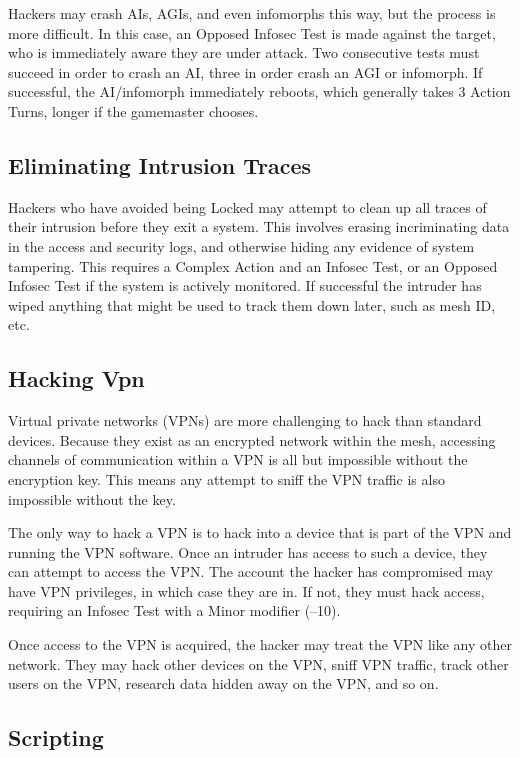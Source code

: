 Hackers may crash AIs, AGIs, and even infomorphs 
this way, but the process is more difficult. In this case, 
an Opposed Infosec Test is made against the target, 
who is immediately aware they are under attack. Two 
consecutive tests must succeed in order to crash an AI, 
three in order crash an AGI or infomorph. If successful, 
the AI/infomorph immediately reboots, which generally 
takes 3 Action Turns, longer if the gamemaster chooses.

\subsection{Eliminating Intrusion Traces}

Hackers who have avoided being Locked may attempt 
to clean up all traces of their intrusion before they 
exit a system. This involves erasing incriminating data 
in the access and security logs, and otherwise hiding 
any evidence of system tampering. This requires a 
Complex Action and an Infosec Test, or an Opposed 
Infosec Test if the system is actively monitored. If successful
the intruder has wiped anything that might be
used to track them down later, such as mesh ID, etc.

\subsection{Hacking Vpn}

Virtual private networks (VPNs) are more challenging
to hack than standard devices. Because they exist
as an encrypted network within the mesh, accessing 
channels of communication within a VPN is all but 
impossible without the encryption key. This means 
any attempt to sniff the VPN traffic is also impossible
without the key.

The only way to hack a VPN is to hack into a 
device that is part of the VPN and running the VPN 
software. Once an intruder has access to such a device, 
they can attempt to access the VPN. The account the 
hacker has compromised may have VPN privileges, in 
which case they are in. If not, they must hack access, 
requiring an Infosec Test with a Minor modifier (–10).

Once access to the VPN is acquired, the hacker may 
treat the VPN like any other network. They may hack 
other devices on the VPN, sniff VPN traffic,  track 
other users on the VPN, research data hidden away 
on the VPN, and so on.

\subsection{Scripting}

